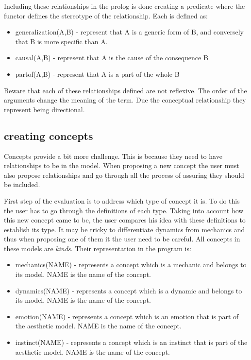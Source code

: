 Including these relationships in the prolog is done creating a predicate where the functor defines the stereotype of the relationship. Each is defined as:
\begin{itemize}
    \item generalization(A,B) - represent that A is a generic form of B, and conversely that B is more specific than A. 
    \item causal(A,B) - represent that A is the cause of the consequence B
    \item partof(A,B) - represent that A is a part of the whole B
\end{itemize}

Beware that each of these relationships defined are not reflexive. The order of the arguments change the meaning of the term. Due the conceptual relationship they represent being directional.

\subsection{creating concepts}

Concepts provide a bit more challenge. This is because they need to have relationships to be in the model. When proposing a new concept the user must also propose relationships and go through all the process of assuring they should be included.

First step of the evaluation is to address which type of concept it is. To do this the user has to go through the definitions of each type. Taking into account how this new concept came to be, the user compares his idea with these definitions to establish its type. It may be tricky to differentiate dynamics from mechanics and thus when proposing one of them it the user need to be careful. All concepts in these models are \textit{kinds}. Their representation in the program is:
\begin{itemize}
    \item mechanics(NAME) - represents a concept which is a mechanic and belongs to its model. NAME is the name of the concept.
    \item dynamics(NAME) - represents a concept which is a dynamic and belongs to its model. NAME is the name of the concept.
    \item emotion(NAME) - represents a concept which is an emotion that is part of the aesthetic model. NAME is the name of the concept.
    \item instinct(NAME) - represents a concept which is an instinct that is part of the aesthetic model. NAME is the name of the concept.
\end{itemize}

